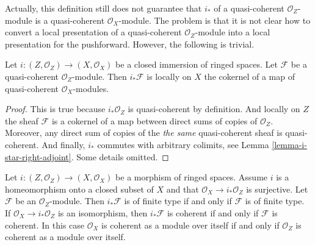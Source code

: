 \noindent
Actually, this definition still does not guarantee that
$i_*$ of a quasi-coherent $\mathcal{O}_Z$-module is a
quasi-coherent $\mathcal{O}_X$-module. The problem is that
it is not clear how to convert a local presentation of
a quasi-coherent $\mathcal{O}_Z$-module into a local
presentation for the pushforward. However, the following
is trivial.

\begin{lemma}
\label{lemma-i-star-quasi-coherent}
Let $i : (Z, \mathcal{O}_Z) \to (X, \mathcal{O}_X)$
be a closed immersion of ringed spaces.
Let $\mathcal{F}$ be a quasi-coherent $\mathcal{O}_Z$-module.
Then $i_*\mathcal{F}$ is locally on $X$ the cokernel of
a map of quasi-coherent $\mathcal{O}_X$-modules.
\end{lemma}

\begin{proof}
This is true because $i_*\mathcal{O}_Z$ is quasi-coherent
by definition. And locally on $Z$ the sheaf $\mathcal{F}$
is a cokernel of a map between direct sums of copies
of $\mathcal{O}_Z$. Moreover, any direct sum of copies of the
{\it the same} quasi-coherent sheaf is quasi-coherent.
And finally, $i_*$ commutes with arbitrary colimits,
see Lemma \ref{lemma-i-star-right-adjoint}. Some details omitted.
\end{proof}

\begin{lemma}
\label{lemma-i-star-reflects-finite-type}
\begin{reference}
\cite[Chapter I, \S 2, no. 17, Propositions 10 and 11 and Corollary,
pp. 211--212]{FAC}
\end{reference}
Let $i : (Z, \mathcal{O}_Z) \to (X, \mathcal{O}_X)$ be a morphism of ringed
spaces. Assume $i$ is a homeomorphism onto a closed subset of $X$ and
that $\mathcal{O}_X \to i_*\mathcal{O}_Z$ is surjective.
Let $\mathcal{F}$ be an $\mathcal{O}_Z$-module.
Then $i_*\mathcal{F}$ is of finite type if and only if
$\mathcal{F}$ is of finite type.
If $\mathcal{O}_X \to i_*\mathcal{O}_Z$ is an isomorphism, then
$i_*\mathcal{F}$ is coherent if and only if $\mathcal{F}$ is coherent.
In this case $\mathcal{O}_X$ is coherent as a module over itself if and
only if $\mathcal{O}_Z$ is coherent as a module over itself.
\end{lemma}


